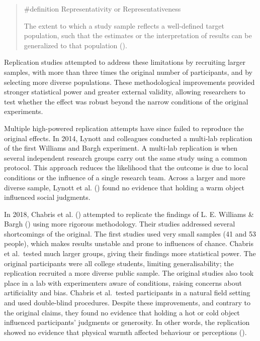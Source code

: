 \documentclass[
  letterpaper,
]{book}
\begin{document}
\begin{quote}
\label{def-representativity}{\#definition}
Representativity or Representativeness

The extent to which a study sample reflects a well-defined target
population, such that the estimates or the interpretation of results can
be generalized to that population
().
\end{quote}

Replication studies attempted to address these limitations by recruiting
larger samples, with more than three times the original number of
participants, and by selecting more diverse populations. These
methodological improvements provided stronger statistical power and
greater external validity, allowing researchers to test whether the
effect was robust beyond the narrow conditions of the original
experiments.

Multiple high-powered replication attempts have since failed to
reproduce the original effects. In 2014, Lynott and colleagues conducted
a multi-lab replication of the first Williams and Bargh experiment. A
multi-lab replication is when several independent research groups carry
out the same study using a common protocol. This approach reduces the
likelihood that the outcome is due to local conditions or the influence
of a single research team. Across a larger and more diverse sample,
Lynott et al. () found no
evidence that holding a warm object influenced social judgments.

In 2018, Chabris et al. () attempted
to replicate the findings of L. E. Williams \& Bargh
() using more rigorous
methodology. Their studies addressed several shortcomings of the
original. The first studies used very small samples (41 and 53 people),
which makes results unstable and prone to influences of chance. Chabris
et al.~tested much larger groups, giving their findings more statistical
power. The original participants were all college students, limiting
generalisability; the replication recruited a more diverse public
sample. The original studies also took place in a lab with experimenters
aware of conditions, raising concerns about artificiality and bias.
Chabris et al.~tested participants in a natural field setting and used
double-blind procedures. Despite these improvements, and contrary to the
original claims, they found no evidence that holding a hot or cold
object influenced participants' judgments or generosity. In other words,
the replication showed no evidence that physical warmth affected
behaviour or perceptions ().
\end{document}
